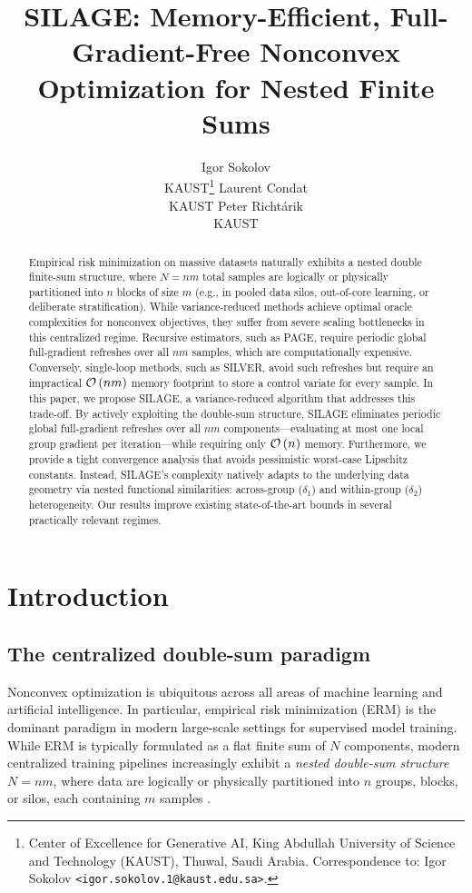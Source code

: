 \documentclass{article}
\title{SILAGE: Memory-Efficient, Full-Gradient-Free Nonconvex Optimization for Nested Finite Sums}
\author{%
Igor Sokolov \\
KAUST\thanks{Center of Excellence for Generative AI, King Abdullah University of Science and Technology (KAUST), Thuwal, Saudi Arabia. Correspondence to: Igor Sokolov \texttt{<igor.sokolov.1@kaust.edu.sa>}.}
\And
Laurent Condat \\
KAUST
\And
Peter Richt\'arik \\
KAUST
}
\newcommand{\cO}{{\cal O}}
\newcommand{\rb}[1]{\left(#1\right)}
\theoremstyle{plain}
\newcommand{\algname}[1]{{\sf\scalefont{0.88}\color{mydarkgreen}#1}\xspace}
\def\algname#1{#1}%
\begin{document}
\maketitle
\begin{abstract}

Empirical risk minimization on massive datasets naturally exhibits a nested double finite-sum structure, where $N=nm$ total samples are logically or physically partitioned into $n$ blocks of size $m$ (e.g., in pooled data silos, out-of-core learning, or deliberate stratification). While variance-reduced methods achieve optimal oracle complexities for nonconvex objectives, they suffer from severe scaling bottlenecks in this centralized regime. Recursive estimators, such as \algname{PAGE}, require periodic global full-gradient refreshes over all $nm$ samples, which are computationally expensive. Conversely, single-loop methods, such as \algname{SILVER}, avoid such refreshes but require an impractical $\cO\rb{nm}$ memory footprint to store a control variate for every sample. In this paper, we propose \algname{SILAGE}, a variance-reduced algorithm that addresses this trade-off. By actively exploiting the double-sum structure, \algname{SILAGE} eliminates periodic global full-gradient refreshes over all $nm$ components---evaluating at most one local group gradient per iteration---while requiring only $\cO\rb{n}$ memory. Furthermore, we provide a tight convergence analysis that avoids pessimistic worst-case Lipschitz constants. Instead, \algname{SILAGE}'s complexity natively adapts to the underlying data geometry via nested functional similarities: across-group ($\delta_1$) and within-group ($\delta_2$) heterogeneity. Our results improve existing state-of-the-art bounds in several practically relevant regimes.

\end{abstract}


\section{Introduction}\label{sec:intro}

\subsection{The centralized double-sum paradigm}




Nonconvex optimization is ubiquitous across all areas of machine learning and artificial intelligence. In particular, empirical risk minimization (ERM) is the dominant paradigm in modern large-scale settings for supervised model training. While ERM is typically formulated as a flat finite sum of $N$ components, modern centralized training pipelines increasingly exhibit a \emph{nested double-sum structure} $N = nm$, where data are logically or physically partitioned into $n$ groups, blocks, or silos, each containing $m$ samples \citep{kon16a, mcm17, evgeniou2004regularized, caruana1997multitask, sadievdon, yi2024cohort, sokolov2024marina}. 
\end{document}

